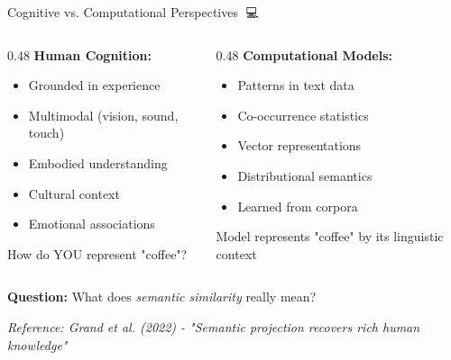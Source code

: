 \documentclass[aspectratio=169]{beamer}
\begin{document}
\begin{frame}[shrink=10]{Cognitive vs. Computational Perspectives 🧠💻}
\begin{columns}[T]
\begin{column}{0.48\textwidth}
\textbf{Human Cognition:}
\begin{itemize}\setlength{\itemsep}{0pt}
    \item Grounded in experience
    \item Multimodal (vision, sound, touch)
    \item Embodied understanding
    \item Cultural context
    \item Emotional associations
\end{itemize}

\vspace{1em}
\alert{How do YOU represent "coffee"?}
\end{column}

\pause

\begin{column}{0.48\textwidth}
\textbf{Computational Models:}
\begin{itemize}\setlength{\itemsep}{0pt}
    \item Patterns in text data
    \item Co-occurrence statistics
    \item Vector representations
    \item Distributional semantics
    \item Learned from corpora
\end{itemize}

\vspace{1em}
\alert{Model represents "coffee" by its linguistic context}
\end{column}
\end{columns}

\vspace{1em}
\begin{center}
\textbf{Question:} What does \textit{semantic similarity} really mean?
\end{center}

\small
\textit{Reference: Grand et al. (2022) - "Semantic projection recovers rich human knowledge"}
\end{frame}
\end{document}
